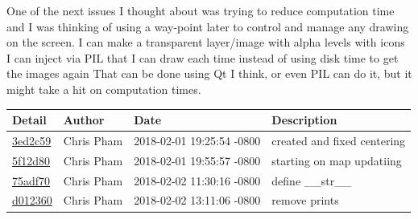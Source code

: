 \newline
One of the next issues I thought about was trying to reduce computation time and I was thinking of using a way-point later to control and manage any drawing on the screen.
I can make a transparent layer/image with alpha levels with icons I can inject via PIL that I can draw each time instead of using disk time to get the images again
That can be done using Qt I think, or even PIL can do it, but it might take a hit on computation times.
\begin{center}
\begin{tabular}{l l l l}	\textbf{Detail} & \textbf{Author} & \textbf{Date} &\textbf{Description}\\\hline
\href{https://github.com/OSURoboticsClub/Rover_2017_2018/commit/3ed2c5977e41dc8f4baee7b10d7c3114793e29d7}{3ed2c59} & Chris Pham & 2018-02-01 19:25:54 -0800 &created and fixed centering\\\hline
\href{https://github.com/OSURoboticsClub/Rover_2017_2018/commit/5f12d8074f8fcfb799f6ac3493cb39081bb7f7c3}{5f12d80} & Chris Pham & 2018-02-01 19:55:57 -0800 &starting on map updatiing\\\hline
\href{https://github.com/OSURoboticsClub/Rover_2017_2018/commit/75adf70d5bfba0e4b7b48bf7cefbc88feb68f4de}{75adf70} & Chris Pham & 2018-02-02 11:30:16 -0800 &define \_\_str\_\_\\\hline
\href{https://github.com/OSURoboticsClub/Rover_2017_2018/commit/d012360da50b074efb9a1cc1f7c1e0dacda207e7}{d012360} & Chris Pham & 2018-02-02 13:11:06 -0800 &remove prints\\\hline
\hline\end{tabular}
\end{center}
